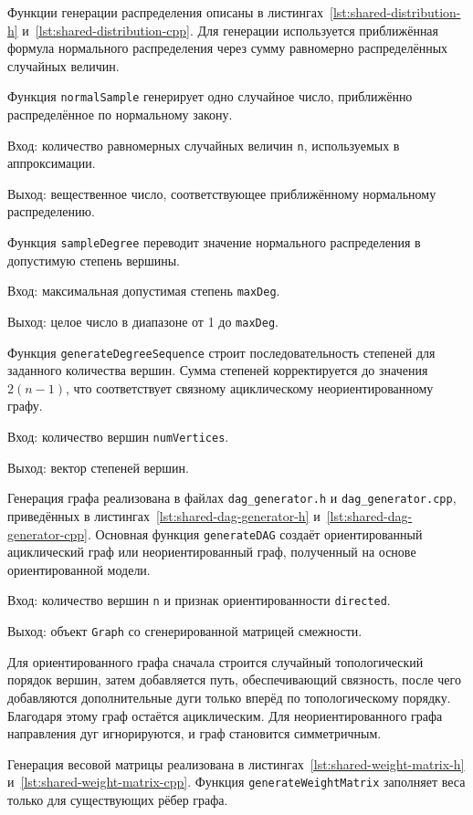 \documentclass[a4paper,final]{article}
\begin{document}
Функции генерации распределения описаны в листингах~\ref{lst:shared-distribution-h} и~\ref{lst:shared-distribution-cpp}. Для генерации используется приближённая формула нормального распределения через сумму равномерно распределённых случайных величин.

Функция \texttt{normalSample} генерирует одно случайное число, приближённо распределённое по нормальному закону.

Вход: количество равномерных случайных величин \texttt{n}, используемых в аппроксимации.

Выход: вещественное число, соответствующее приближённому нормальному распределению.

Функция \texttt{sampleDegree} переводит значение нормального распределения в допустимую степень вершины.

Вход: максимальная допустимая степень \texttt{maxDeg}.

Выход: целое число в диапазоне от 1 до \texttt{maxDeg}.

Функция \texttt{generateDegreeSequence} строит последовательность степеней для заданного количества вершин. Сумма степеней корректируется до значения $2(n-1)$, что соответствует связному ациклическому неориентированному графу.

Вход: количество вершин \texttt{numVertices}.

Выход: вектор степеней вершин.

Генерация графа реализована в файлах \texttt{dag\_generator.h} и \texttt{dag\_generator.cpp}, приведённых в листингах~\ref{lst:shared-dag-generator-h} и~\ref{lst:shared-dag-generator-cpp}. Основная функция \texttt{generateDAG} создаёт ориентированный ациклический граф или неориентированный граф, полученный на основе ориентированной модели.

Вход: количество вершин \texttt{n} и признак ориентированности \texttt{directed}.

Выход: объект \texttt{Graph} со сгенерированной матрицей смежности.

Для ориентированного графа сначала строится случайный топологический порядок вершин, затем добавляется путь, обеспечивающий связность, после чего добавляются дополнительные дуги только вперёд по топологическому порядку. Благодаря этому граф остаётся ациклическим. Для неориентированного графа направления дуг игнорируются, и граф становится симметричным.

Генерация весовой матрицы реализована в листингах~\ref{lst:shared-weight-matrix-h} и~\ref{lst:shared-weight-matrix-cpp}. Функция \texttt{generateWeightMatrix} заполняет веса только для существующих рёбер графа.
\end{document}
